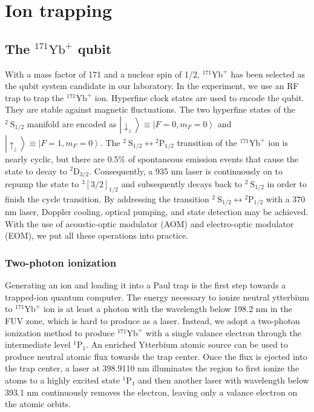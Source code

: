 
\chapter{Ion trapping}

\section{The \texorpdfstring{${ }^{171} \mathrm{Yb}^{+}$}{} qubit}

With a mass factor of 171 and a nuclear spin of 1/2, ${ }^{171} \mathrm{Yb}^{+}$ has been selected as the qubit system candidate in our laboratory. In the experiment, we use an RF trap to trap the ${ }^{171} \mathrm{Yb}^{+}$ ion. Hyperfine clock states are used to encode the qubit. They are stable against magnetic fluctuations. The two hyperfine states of the ${ }^2 \mathrm{~S}_{1 / 2}$ manifold are encoded as $\left|\downarrow_z\right\rangle \equiv\left|F=0, m_F=0\right\rangle$ and $\left|\uparrow_z\right\rangle \equiv\left|F=1, m_F=0\right\rangle$. The ${ }^2 \mathrm{~S}_{1 / 2} \leftrightarrow{ }^2 \mathrm{P}_{1 / 2}$ transition of the ${ }^{171} \mathrm{Yb}^{+}$ ion is nearly cyclic, but there are 0.5\% of spontaneous emission events that cause the state to decay to ${ }^2 \mathrm{D}_{3 / 2}$. Consequently, a 935 nm laser is continuously on to repump the state to ${ }^{3} [3 / 2]_{1 / 2}$ and subsequently decays back to ${ }^2 \mathrm{~S}_{1 / 2}$ in order to finish the cycle transition. By addressing the transition ${ }^2 \mathrm{~S}_{1 / 2} \leftrightarrow{ }^2 \mathrm{P}_{1 / 2}$ with a 370 nm laser, Doppler cooling, optical pumping, and state detection may be achieved. With the use of acoustic-optic modulator (AOM) and electro-optic modulator (EOM), we put all these operations into practice.

\subsection{Two-photon ionization}

Generating an ion and loading it into a Paul trap is the first step towards a trapped-ion quantum computer. The energy necessary to ionize neutral ytterbium to ${ }^{171} \mathrm{Yb}^{+}$ ion is at least a photon with the wavelength below 198.2 nm in the FUV zone, which is hard to produce as a laser. Instead, we adopt a two-photon ionization method to produce ${ }^{171} \mathrm{Yb}^{+}$ with a single valance electron through the intermediate level ${ }^1 \mathrm{P}_1$. An enriched Ytterbium atomic source can be used to produce neutral atomic flux towards the trap center. Once the flux is ejected into the trap center, a laser at 398.9110 nm illuminates the region to first ionize the atoms to a highly excited state ${ }^1 \mathrm{P}_1$ and then another laser with wavelength below 393.1 nm continuously removes the electron, leaving only a valance electron on the atomic orbits.

